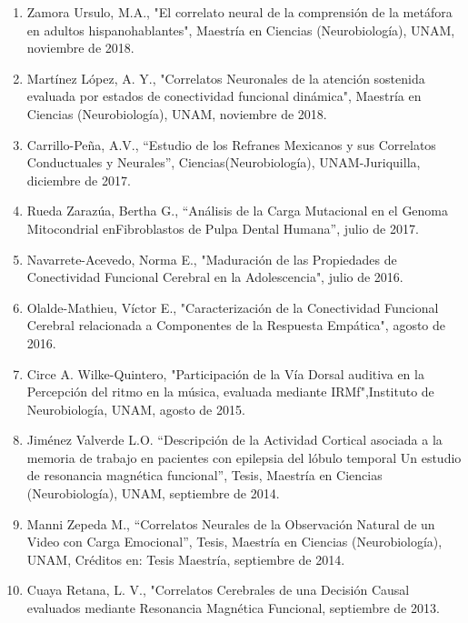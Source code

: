 \begin{enumerate}
\item  Zamora Ursulo, M.A., "El correlato neural de la comprensión de la metáfora en adultos hispanohablantes", Maestría en 
Ciencias (Neurobiología), UNAM, noviembre de 2018.

\item  Martínez López, A. Y., "Correlatos Neuronales de la atención sostenida evaluada por estados de conectividad funcional 
dinámica", Maestría en Ciencias (Neurobiología), UNAM, noviembre de 2018.

\item  Carrillo-Peña, A.V., “Estudio de los Refranes Mexicanos y sus Correlatos Conductuales y Neurales”, 
Ciencias(Neurobiología), 
UNAM-Juriquilla, diciembre de 2017.

\item  Rueda Zarazúa, Bertha G., “Análisis de la Carga Mutacional en el Genoma Mitocondrial enFibroblastos de Pulpa Dental 
Humana”, julio de 2017.

\item  Navarrete-Acevedo, Norma E., "Maduración de las Propiedades de Conectividad Funcional Cerebral en la Adolescencia", 
julio de 2016.

\item  Olalde-Mathieu, Víctor E., "Caracterización de la Conectividad Funcional Cerebral relacionada a Componentes de la 
Respuesta 
Empática", agosto de 2016.

\item  Circe A. Wilke-Quintero, "Participación de la Vía Dorsal auditiva en la Percepción del ritmo en la música, evaluada 
mediante IRMf",Instituto de Neurobiología, UNAM, agosto de 2015.

\item  Jiménez Valverde L.O. “Descripción de la Actividad Cortical asociada a la memoria de trabajo en pacientes con epilepsia 
del 
lóbulo temporal Un estudio de resonancia magnética funcional”, Tesis, Maestría en Ciencias (Neurobiología), UNAM, septiembre de 2014.

\item  Manni Zepeda M., “Correlatos Neurales de la Observación Natural de un Video con Carga Emocional”, Tesis, Maestría en 
Ciencias (Neurobiología), UNAM, Créditos en: Tesis Maestría, septiembre de 2014.

\item  Cuaya Retana, L. V., "Correlatos Cerebrales de una Decisión Causal evaluados mediante Resonancia Magnética Funcional, 
septiembre de 2013.


\end{enumerate}
